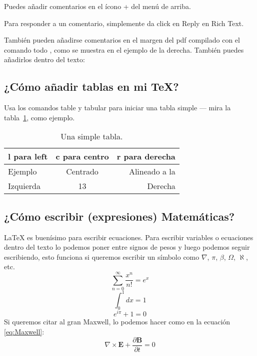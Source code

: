 \documentclass[a4paper]{article}
\begin{document}
	Puedes añadir comentarios en el ícono + del menú de arriba.
	
	Para responder a un comentario, simplemente da click en Reply en Rich Text.
	
	También pueden añadirse comentarios en el margen del pdf compilado con el comando todo , como se muestra en el ejemplo de la derecha. También puedes añadirlos dentro del texto:
	
	
	\subsection{¿Cómo añadir tablas en mi \TeX?}
	
	Usa los comandos table y tabular para iniciar una tabla simple --- mira la tabla~\ref{tab:tabla ejemplo}, como ejemplo. 
	
	\begin{table}
		\centering
		\begin{tabular}{l c r} 
			l para left & c para centro & r para derecha \\ \hline
			Ejemplo & Centrado & Alineado a la\\
			Izquierda & 13 & Derecha
		\end{tabular}
		\caption{\label{tab:tabla ejemplo}Una simple tabla.}
	\end{table}
	
	\subsection{¿Cómo escribir (expresiones) Matemáticas?}
	
	\LaTeX{} es buenísimo para escribir ecuaciones. Para escribir variables o ecuaciones dentro del texto lo podemos poner entre signos de pesos y luego podemos seguir escribiendo, esto funciona si queremos escribir un símbolo como $\nabla$, $\pi$, $\beta$, $\Omega$, $\aleph$, etc.
	\begin{equation}
		\sum_{n=0}^\infty \frac{x^n}{n!}=e^x
	\end{equation}
	\begin{equation}
		\int_{0}^{1}dx=1
	\end{equation}
	\begin{equation}
		e^{i\pi}+1=0
	\end{equation}
	Si queremos citar al gran Maxwell, lo podemos hacer como en la ecuación \ref{eq:Maxwell}:
	\begin{equation}
		\nabla\times\mathbf{E}+\frac{\partial\mathbf{B}}{\partial t}=0\label{eq:Maxwell}
	\end{equation}
	
\end{document}
